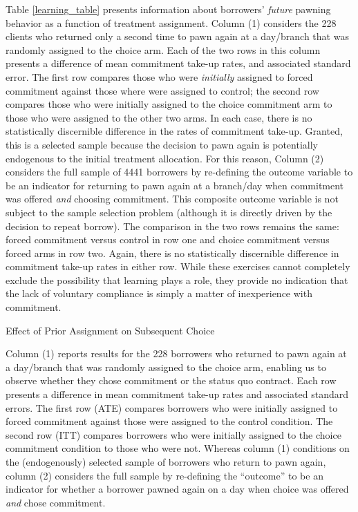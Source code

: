 \begin{appendix}
Table \ref{learning_table} presents information about borrowers' \emph{future} pawning behavior as a function of treatment assignment. Column (1) considers the 228 clients who returned only a second time to pawn again at a day/branch that was randomly assigned to the choice arm. Each of the two rows in this column presents a difference of mean commitment take-up rates, and associated standard error. The first row compares those who were \emph{initially} assigned to forced commitment against those where were assigned to control; the second row compares those who were initially assigned to the choice commitment arm to those who were assigned to the other two arms. In each case, there is no statistically discernible difference in the rates of commitment take-up. Granted, this is a selected sample because the decision to pawn again is potentially endogenous to the initial treatment allocation. For this reason, Column (2) considers the full sample of 4441 borrowers by re-defining the outcome variable to be an indicator for returning to pawn again at a branch/day when commitment was offered \emph{and} choosing commitment. This composite outcome variable is not subject to the sample selection problem (although it is directly driven by the decision to repeat borrow). The comparison in the two rows remains the same: forced commitment versus control in row one and choice commitment versus forced arms in row two. Again, there is no statistically discernible difference in commitment take-up rates in either row. While these exercises cannot completely exclude the possibility that learning plays a role, they provide no indication that the lack of voluntary compliance is simply a matter of inexperience with commitment.



\begin{table}[H]
        \caption{Effect of Prior Assignment on Subsequent Choice}
    \label{learning_table}
\begin{center}
\footnotesize{}
\end{center}
 \footnotesize{Column (1) reports results for the 228 borrowers who returned to pawn again at a day/branch that was randomly assigned to the choice arm, enabling us to observe whether they chose commitment or the status quo contract.
Each row presents a difference in mean commitment take-up rates and associated standard errors.
The first row (ATE) compares borrowers who were initially assigned to forced commitment against those were assigned to the control condition.
The second row (ITT) compares borrowers who were initially assigned to the choice commitment condition to those who were not.
Whereas column (1) conditions on the (endogenously) selected sample of borrowers who return to pawn again, column (2) considers the full sample by re-defining the ``outcome'' to be an indicator for whether a borrower pawned again on a day when choice was offered \emph{and} chose commitment.}


\end{table}
\end{appendix}
